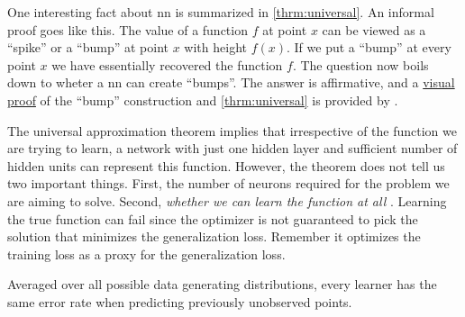 One interesting fact about \gls{nn} is summarized in \Theorem{}
\ref{thrm:universal}. An informal proof goes like this. The value of a function
$f$ at point $x$ can be viewed as a ``spike'' or a ``bump'' at point $x$ with
height $f(x)$. If we put a ``bump'' at every point $x$ we have essentially recovered
the function $f$. The question now boils down to wheter a \gls{nn} can create
``bumps''. The answer is affirmative, and a
\href{http://neuralnetworksanddeeplearning.com/chap4.html}{visual proof} of the
``bump'' construction and \Theorem{} \ref{thrm:universal} is provided by
\cite{Nielsen2018}.

The universal approximation theorem implies that irrespective
of the function we are trying to learn, a network with just one hidden layer and
sufficient number of hidden units can represent this function. However, the
theorem does not tell us two important things. First, the number of neurons
required for the problem we are aiming to solve. Second, \emph{whether we can
learn the function at all} \parencite{deeplearning}. Learning the true function
can fail since the optimizer is not guaranteed to pick the solution that
minimizes the generalization loss. Remember it
optimizes the training loss as a proxy for the
generalization loss.

\begin{theorem}
	\label{thrm:nfl}
	Averaged over all possible data generating distributions, every
	learner has the same error rate when predicting previously
	unobserved points.
\end{theorem}

